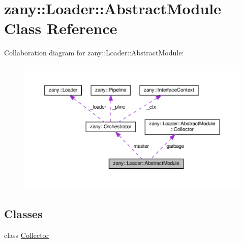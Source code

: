 \hypertarget{classzany_1_1_loader_1_1_abstract_module}{}\section{zany\+:\+:Loader\+:\+:Abstract\+Module Class Reference}
\label{classzany_1_1_loader_1_1_abstract_module}


Collaboration diagram for zany\+:\+:Loader\+:\+:Abstract\+Module\+:
\nopagebreak
\begin{figure}[H]
\begin{center}
\leavevmode
\includegraphics[width=350pt]{classzany_1_1_loader_1_1_abstract_module__coll__graph}
\end{center}
\end{figure}
\subsection*{Classes}
\begin{DoxyCompactItemize}
\item 
class \hyperlink{classzany_1_1_loader_1_1_abstract_module_1_1_collector}{Collector}
\end{DoxyCompactItemize}
